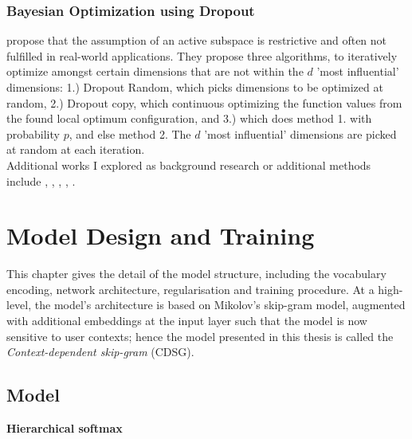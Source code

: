 \documentclass[a4paper,12pt,twoside,openright]{report}
\newcommand{\tb}{\vspace{10pt} \textbf}
\newcommand{\ti}{\textit}
\begin{document}
\subsection{Bayesian Optimization using Dropout}

\citep{Li2018} propose that the assumption of an active subspace is restrictive and often not fulfilled in real-world applications.
They propose three algorithms, to iteratively optimize amongst certain dimensions that are not within the $d$ 'most influential' dimensions: 1.) Dropout Random, which picks dimensions to be optimized at random, 2.) Dropout copy, which continuous optimizing the function values from the found local optimum configuration, and 3.) which does method 1. with probability $p$, and else method 2.
The $d$ 'most influential' dimensions are picked at random at each iteration. \\

Additional works I explored as background research or additional methods include \citep{KernelGibbsSampler}, \citep{VirtualVsReal}, \citep{SensorPlacement}, \citep{BatchedBO}, \citep{GPforML}.

\chapter{Model Design and Training} 
\label{ch4}

This chapter gives the detail of the model structure, including the vocabulary encoding, network architecture, regularisation and training procedure. At a high-level, the model's architecture is based on Mikolov's skip-gram model, augmented with additional embeddings at the input layer such that the model is now sensitive to user contexts; hence the model presented in this thesis is called the \ti{Context-dependent skip-gram} (CDSG).

\section{Model}

\tb{Hierarchical softmax}
\end{document}
